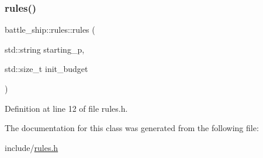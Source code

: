 \mbox{\label{classbattle__ship_1_1rules_a3385bb490b9f69c7e2ccd4406f62c5d4}} 
\subsubsection{\texorpdfstring{rules()}{rules()}\hspace{0.1cm}{\footnotesize\ttfamily [2/2]}}
{\footnotesize\ttfamily battle\+\_\+ship\+::rules\+::rules (\begin{DoxyParamCaption}\item[{std\+::string}]{starting\+\_\+p,  }\item[{std\+::size\+\_\+t}]{init\+\_\+budget }\end{DoxyParamCaption})\hspace{0.3cm}{\ttfamily [inline]}}



Definition at line 12 of file rules.\+h.



The documentation for this class was generated from the following file\+:\begin{DoxyCompactItemize}
\item 
include/\hyperlink{rules_8h}{rules.\+h}\end{DoxyCompactItemize}
